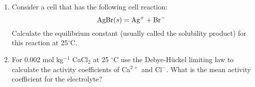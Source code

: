 \begin{enumerate}
\item Consider a cell that has the following cell reaction:
$$\textnormal{AgBr}(s) = \textnormal{Ag}^+ + \textnormal{Br}^-$$
Calculate the equilibrium constant (usually called the solubility product) for this reaction at 25$^\circ$C.\\


\item For 0.002 mol kg$^{-1}$ CaCl$_2$ at 25 $^\circ$C use the Debye-H\"uckel limiting law to calculate the activity coefficients of Ca$^{2+}$ and Cl$^-$. What is the mean activity coefficient for the electrolyte?\\


\end{enumerate}

